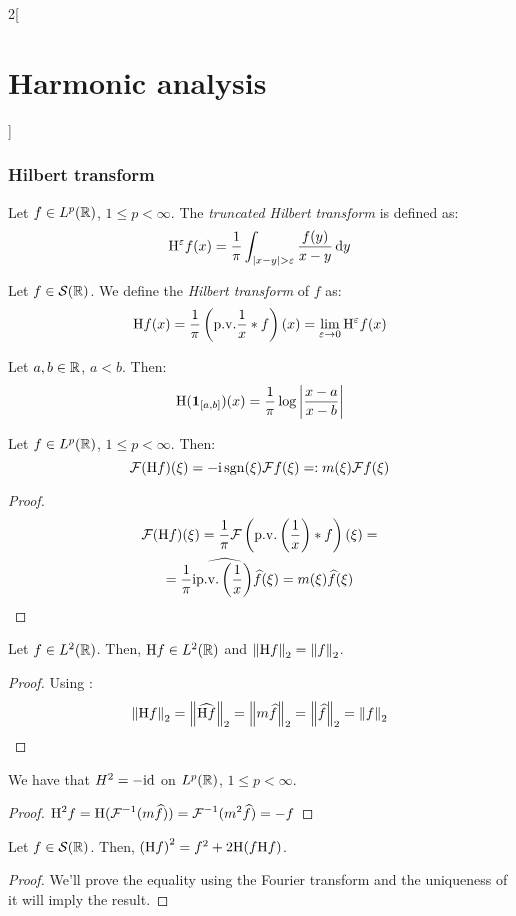 \documentclass[../../../main_math.tex]{subfiles}
\begin{document}
\begin{multicols}{2}[\section{Harmonic analysis}]
  \subsubsection{Hilbert transform}
  \begin{definition}
    Let $f\in L^p(\mathbb{R})$, $1\leq p<\infty$. The \emph{truncated Hilbert transform} is defined as:
    $$
      \mathrm{H}^\varepsilon f(x)=\frac{1}{\pi}\int_{\abs{x-y}>\varepsilon}\frac{f(y)}{x-y}\dd{y}
    $$
  \end{definition}
  \begin{definition}
    Let $f\in \mathcal{S}(\mathbb{R})$. We define the \emph{Hilbert transform} of $f$ as:
    $$
      \mathrm{H} f(x)=\frac{1}{\pi}\left(\mathrm{p.v.}\frac{1}{x}*f\right)(x)=\lim_{\varepsilon\to 0} \mathrm{H}^\varepsilon f(x)
    $$
  \end{definition}
  \begin{lemma}
    Let $a,b\in\mathbb{R}$, $a<b$. Then:
    $$
      \mathrm{H}(\boldsymbol{\mathrm{1}}_{[a,b]})(x)=\frac{1}{\pi}\log\left| \frac{x-a}{x-b}\right|
    $$
  \end{lemma}
  \begin{proposition}
    Let $f\in L^p(\mathbb{R})$, $1\leq p<\infty$. Then:
    $$
      \mathcal{F}(\mathrm{H} f)(\xi)=-\mathrm{i}\operatorname{sgn}(\xi)\mathcal{F} f(\xi)=:m(\xi)\mathcal{F} f(\xi)
    $$
  \end{proposition}
  \begin{proof}
    \begin{multline*}
      \mathcal{F}(\mathrm{H} f)(\xi)=\frac{1}{\pi}\mathcal{F}\left(\mathrm{p.v.}\left(\frac{1}{x}\right)*f\right)(\xi)=\\
      =\frac{1}{\pi}\mathrm{i} \widehat{\mathrm{p.v.}\left(\frac{1}{x}\right)}\widehat{f}(\xi)=m(\xi)\widehat{f}(\xi)
    \end{multline*}
  \end{proof}
  \begin{lemma}
    Let $f\in L^2(\mathbb{R})$. Then, $\mathrm{H} f\in L^2(\mathbb{R})$ and $\left\|\mathrm{H} f\right\|_{2}= \left\|f\right\|_{2}$.
  \end{lemma}
  \begin{proof}
    Using :
    $$
      \left\|\mathrm{H} f\right\|_{2} = \left\|\widehat{\mathrm{H} f}\right\|_{2}=\left\|m\widehat{f}\right\|_{2}=\left\|\widehat{f}\right\|_{2}=\left\|f\right\|_{2}
    $$
  \end{proof}
  \begin{lemma}
    We have that $H^2=-\mathrm{id}$ on $L^p(\mathbb{R})$, $1\leq p<\infty$.
  \end{lemma}
  \begin{proof}
    $\displaystyle
      \mathrm{H}^2 f=\mathrm{H}(\mathcal{F}^{-1}(m\widehat{f}))=\mathcal{F}^{-1}(m^2\widehat{f})=-f
    $
  \end{proof}
  \begin{lemma}\label{HA:prethmSingInt}
    Let $f\in \mathcal{S}(\mathbb{R})$. Then, ${(\mathrm{H} f)}^2=f^2+2\mathrm{H}(f\mathrm{H} f)$.
  \end{lemma}
  \begin{proof}
    We'll prove the equality using the Fourier transform and the uniqueness of it will imply the result.


\end{proof}
\end{multicols}
\end{document}
